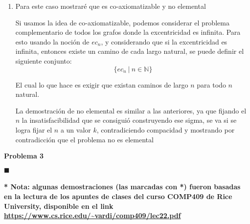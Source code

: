 \documentclass[letterpaper,10pt]{article}
\begin{document}
\begin{enumerate}
    \item Para este caso mostraré que es co-axiomatizable y no elemental

    Si usamos la idea de co-axiomatizable, podemos considerar el problema complementario de todos los grafos donde la excentricidad es infinita. Para esto usando la noción de $ec_n$, y considerando que si la excentricidad es infinita, entonces existe un camino de cada largo natural, se puede definir el siguiente conjunto:
    $$\{ec_n \ | \ n \in \mathbb{N}\}$$

    El cual lo que hace es exigir que existan caminos de largo $n$ para todo $n$ natural.

    La demostración de no elemental es similar a las anteriores, ya que fijando el $n$ la insatisfacibilidad que se consiguió construyendo ese sigma, se va si se logra fijar el $n$ a un valor $k$, contradiciendo compacidad y mostrando por contradicción que el problema no es elemental


\end{enumerate}


\textbf{Problema 3}

    $\blacksquare$\\\\


\textbf{* Nota: algunas demostraciones (las marcadas con *) fueron basadas en la lectura de los apuntes de clases del curso COMP409 de Rice University, disponible en el link \url{https://www.cs.rice.edu/~vardi/comp409/lec22.pdf}}
\end{document}
